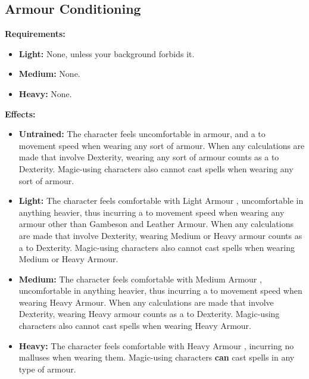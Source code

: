 \subsection{Armour Conditioning}
\begin{table}[!ht]
\centering
{}
\end{table}
\textbf{Requirements:}
\begin{itemize}
	\item \textbf{Light:} None, unless your background forbids it.
	\item \textbf{Medium:} None.
	\item \textbf{Heavy:} None.
\end{itemize}
\textbf{Effects:}
\begin{itemize}
	\item \textbf{Untrained:} The character feels uncomfortable in armour, and a  to movement speed when wearing any sort of armour. When any calculations are made that involve Dexterity, wearing any sort of armour counts as a  to Dexterity. Magic-using characters also cannot cast spells when wearing any sort of armour.
	\item \textbf{Light:} The character feels comfortable with Light Armour , uncomfortable in anything heavier, thus incurring a  to movement speed when wearing any armour other than Gambeson and Leather Armour. When any calculations are made that involve Dexterity, wearing Medium or Heavy armour counts as a  to Dexterity. Magic-using characters also cannot cast spells when wearing Medium or Heavy Armour.
	\item \textbf{Medium:} The character feels comfortable with Medium Armour , uncomfortable in anything heavier, thus incurring a  to movement speed when wearing Heavy Armour. When any calculations are made that involve Dexterity, wearing Heavy armour counts as a  to Dexterity. Magic-using characters also cannot cast spells when wearing Heavy Armour.
	\item \textbf{Heavy:} The character feels comfortable with Heavy Armour , incurring no malluses when wearing them. Magic-using characters \textbf{can} cast spells in any type of armour.
\end{itemize}\newpage
